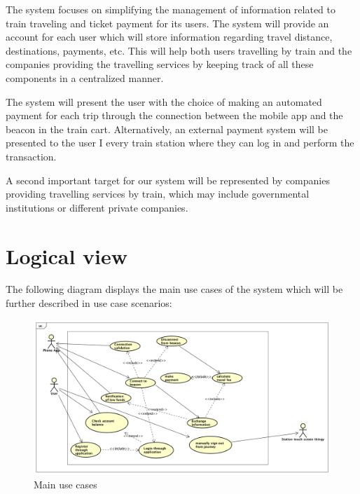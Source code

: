 The system focuses on simplifying the management of information related to train traveling and ticket payment for its users. The system will provide an account for each user which will store information regarding travel distance, destinations, payments, etc. This will help both users travelling by train and the companies providing the travelling services by keeping track of all these components in a centralized manner. 

The system will present the user with the choice of making an automated payment for each trip through the connection between the mobile app and the beacon in the train cart. Alternatively, an external payment system will be presented to the user I every train station where they can log in and perform the transaction. 

A second important target for our system will be represented by companies providing travelling services by train, which may include governmental institutions or different private companies.

\section{Logical view}

The following diagram displays the main use cases of the system which will be further described in use case scenarios:

\begin{figure}[H]
	\centering
	\includegraphics[width=500pt]{Pictures/main_use_cases.png}
	\caption{Main use cases}
	\label{fig:main_use_cases}
\end{figure}

